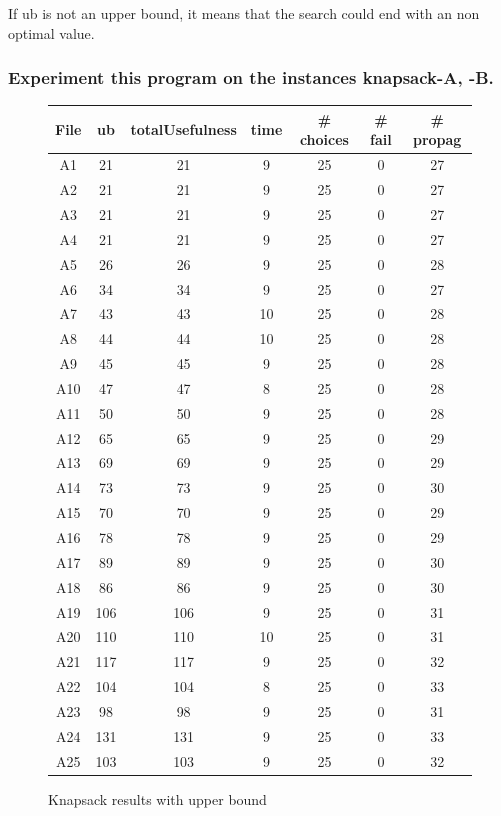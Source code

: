\documentclass[a4paper ,12pt,french]{article}
\begin{document}
If ub is not an upper bound, it means that the search could end with an non optimal value.

\subsubsection{Experiment this program on the instances knapsack-A, -B. }



\begin{figure}[!ht]
\begin{tabular}{|c|c|c|c|c|c|c|}
\hline
File & ub & totalUsefulness & time & \# choices & \# fail & \# propag\\
\hline
\hline
A1 & 21 & 21 & 9 & 25 & 0 & 27\\
\hline
A2& 21& 21& 9&25&    0& 27\\
\hline
A3& 21& 21& 9&25&    0& 27\\
\hline
A4& 21& 21& 9&25&    0& 27\\
\hline
A5& 26& 26& 9&25&    0& 28\\
\hline
A6& 34& 34& 9&25&    0& 27\\
\hline
A7& 43& 43& 10&25&    0& 28\\
\hline
A8& 44& 44& 10&25&    0& 28\\
\hline
A9& 45& 45& 9&25&    0& 28\\
\hline
A10& 47& 47& 8&25&    0& 28\\
\hline
A11& 50& 50& 9&25&    0& 28\\
\hline
A12& 65& 65& 9&25&    0& 29\\
\hline
A13& 69& 69& 9&25&    0& 29\\
\hline
A14& 73& 73& 9&25&    0& 30\\
\hline
A15& 70& 70& 9&25&    0& 29\\
\hline
A16& 78& 78& 9&25&    0& 29\\
\hline
A17& 89& 89& 9&25&    0& 30\\
\hline
A18& 86& 86& 9&25&    0& 30\\
\hline
A19& 106& 106& 9&25&    0& 31\\
\hline
A20& 110& 110& 10&25&    0& 31\\
\hline
A21& 117& 117& 9&25&    0& 32\\
\hline
A22& 104& 104& 8&25&    0& 33\\
\hline
A23& 98& 98& 9&25&    0& 31\\
\hline
A24& 131& 131& 9&25&    0& 33\\
\hline
A25& 103& 103& 9&25&    0& 32\\
\hline
\end{tabular}
\caption{Knapsack results with upper bound}
\label{FIGA}
\end{figure}
\end{document}
